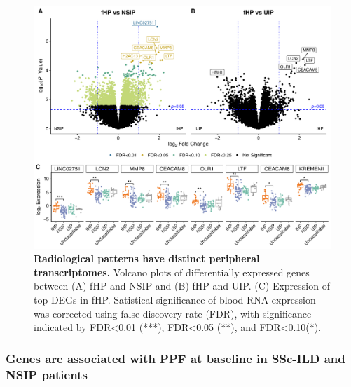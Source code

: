 \documentclass[
]{article}
\begin{document}
\begin{figure}

{\centering \includegraphics[width=1.0\linewidth,]{./Figures/BloodRNAseq/radiology_deg_v1} 

}

\caption[Radiological transcriptome]{\textbf{Radiological patterns have distinct peripheral transcriptomes.} Volcano plots of differentially expressed genes between (A) fHP and NSIP and (B) fHP and UIP. (C) Expression of top DEGs in fHP. Satistical significance of blood RNA expression was corrected using false discovery rate (FDR), with significance indicated by FDR\textless0.01 (***), FDR\textless0.05 (**), and FDR\textless0.10(*).}\label{fig:raddeg}
\end{figure}

\subsubsection{Genes are associated with PPF at baseline in SSc-ILD and NSIP patients}\label{genes-are-associated-with-ppf-at-baseline-in-ssc-ild-and-nsip-patients}
\end{document}
